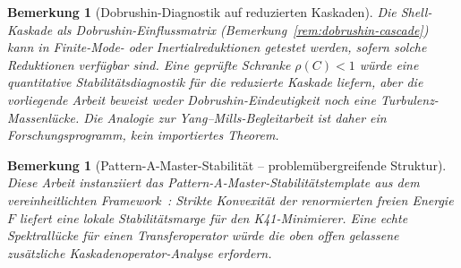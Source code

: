 \documentclass[12pt,a4paper]{article}
\theoremstyle{breakdef}
\theoremstyle{breakplain}
\theoremstyle{breakdef}
\newtheorem{remark}[definition]{Bemerkung}
\begin{document}

\begin{remark}[Dobrushin-Diagnostik auf reduzierten Kaskaden]
\label{rem:dobrushin-inertial}
Die Shell-Kaskade als Dobrushin-Einflussmatrix
(Bemerkung~\ref{rem:dobrushin-cascade}) kann in Finite-Mode- oder
Inertialreduktionen getestet werden, sofern solche Reduktionen verfügbar
sind. Eine geprüfte Schranke $\rho(C)<1$ würde eine quantitative
Stabilitätsdiagnostik für die reduzierte Kaskade liefern, aber die
vorliegende Arbeit beweist weder Dobrushin-Eindeutigkeit noch eine Turbulenz-Massenlücke.
Die Analogie zur Yang--Mills-Begleitarbeit ist daher ein Forschungsprogramm,
kein importiertes Theorem.
\end{remark}

\begin{remark}[Pattern-A-Master-Stabilität -- problemübergreifende Struktur]
Diese Arbeit instanziiert das Pattern-A-Master-Stabilitätstemplate aus dem
vereinheitlichten Framework~\cite{FST-Unified2026}: Strikte Konvexität der
renormierten freien Energie $F$ liefert eine lokale Stabilitätsmarge für
den K41-Minimierer. Eine echte Spektrallücke für einen Transferoperator
würde die oben offen gelassene zusätzliche Kaskadenoperator-Analyse
erfordern.
\end{remark}

{}

\end{document}
